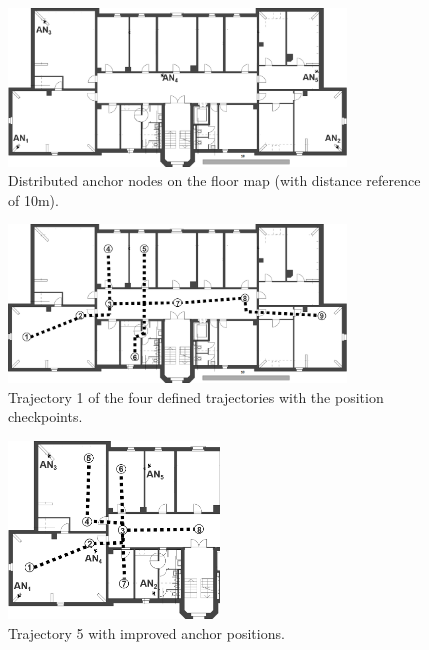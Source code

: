\begin{figure}[th]
\centering
\includegraphics[width=0.8\textwidth]{Figures/anchor_position}
\decoRule
\caption[Anchor node positions]{Distributed anchor nodes on the floor map (with distance reference of 10m).}
\label{fig:anchor_position}
\end{figure}

\begin{figure}[th]
\centering
\includegraphics[width=0.8\textwidth]{Figures/trajectory1}
\decoRule
\caption[Trajectory 1]{Trajectory 1 of the four defined trajectories with the position checkpoints.}
\label{fig:trajectory1}
\end{figure}

\begin{figure}[th]
\centering
\includegraphics[width=0.5\textwidth]{Figures/trajectory5_withAnchors}
\decoRule
\caption[Trajectory 5]{Trajectory 5 with improved anchor positions.}
\label{fig:trajectory5_withAnchors}
\end{figure}

